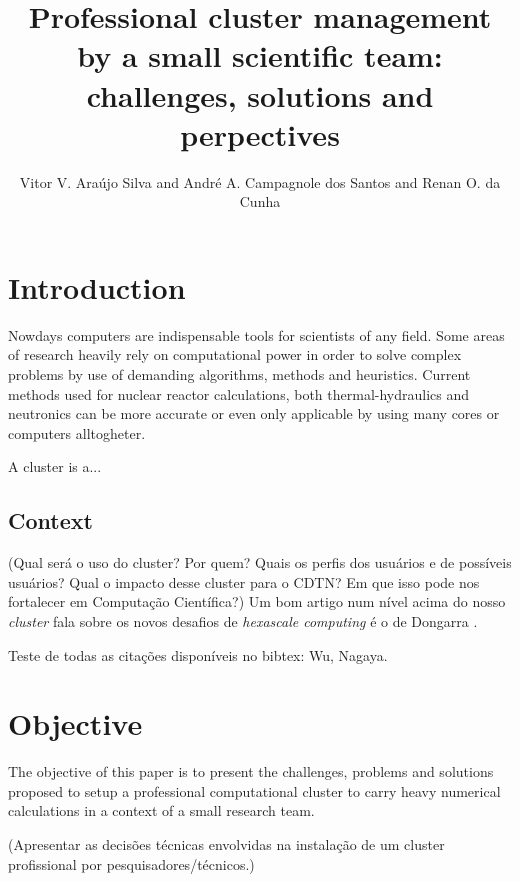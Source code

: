 \documentclass{anstrans}
\title{Professional cluster management by a small scientific team: challenges, solutions
and perpectives}
\author{Vitor V. Araújo Silva and André A. Campagnole dos Santos and Renan O. da Cunha}
\institute{
  Centro de Desenvolvimento da Tecnologia Nuclear - CDTN
}
\begin{document}
\vspace*{-42pt}
\begin{strip}
\vspace*{14pt}
\end{strip}


\section{Introduction}

Nowdays computers are indispensable tools for scientists of any field.
Some areas of research heavily rely on computational power in order to solve
complex problems by use of demanding algorithms, methods and heuristics.
Current methods used for nuclear reactor calculations, both thermal-hydraulics
and neutronics can be more accurate or even only applicable by using
many cores or computers alltogheter.

A cluster is a...

\subsection{Context}
(Qual será o uso do cluster? Por quem? Quais os perfis dos usuários e de possíveis usuários?
Qual o impacto desse cluster para o CDTN? Em que isso pode nos fortalecer em Computação Científica?)
Um bom artigo num nível acima do nosso \textit{cluster} fala sobre os novos desafios de \textit{hexascale computing}
é o de Dongarra \cite{Dongarra2017}.

Teste de todas as citações disponíveis no bibtex: Wu\cite{Wu2016}, Nagaya\cite{Nagaya2015}.

\section{Objective}

The objective of this paper is to present the challenges, problems and solutions proposed
to setup a professional computational
cluster to carry heavy numerical calculations in a context of a small research team.

(Apresentar as decisões técnicas envolvidas na instalação de um cluster
profissional por pesquisadores/técnicos.)
\end{document}

